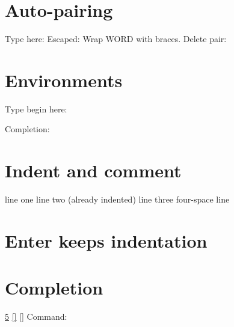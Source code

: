 \documentclass{article}
\begin{document}

\section{Auto-pairing}
Type here:
Escaped:
Wrap WORD with braces.
Delete pair: {}

\section{Environments}
Type begin here:
\begin{enumerate}
\end{enumerate}
Completion:

\section{Indent and comment}
line one
  line two (already indented)
line three
    four-space line

\section{Enter keeps indentation}

\section{Completion}
\ref{}  \cite{}  \eqref{}  \pageref{}  \autoref{}
\newcommand{\vect}[1]{\mathbf{#1}}
Command:
\label{sec:first}\label{fig:second}\label{tab:third}
\end{document}
